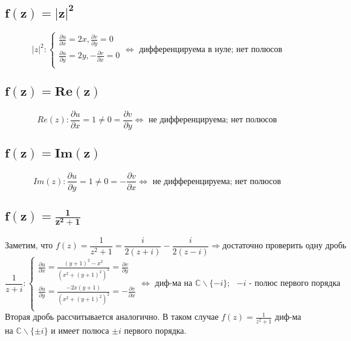 \documentclass[12pt]{article}
\begin{document}
\subsection*{$\mathbf{f(z) = |z|^2}$}
\begin{equation*}
|z|^2:
\begin{cases}
\frac{\partial u}{\partial x} = 2x, \frac{\partial v}{\partial y} = 0 \\
\frac{\partial u}{\partial y} = 2y, -\frac{\partial v}{\partial x} = 0\\
\end{cases}
\Leftrightarrow
\text{ дифференцируема в нуле; нет полюсов}
\end{equation*}

\subsection*{$\mathbf{f(z) = Re(z)}$}
\begin{equation*}
Re(z):
\frac{\partial u}{\partial x} = 1 \neq 0 = \frac{\partial v}{\partial y}
\Leftrightarrow
\text{ не дифференцируема; нет полюсов}
\end{equation*}
\subsection*{$\mathbf{f(z) = Im(z)}$}
\begin{equation*}
Im(z):
\frac{\partial u}{\partial y} = 1 \neq 0 = -\frac{\partial v}{\partial x}
\Leftrightarrow
\text{ не дифференцируема; нет полюсов}
\end{equation*}
\subsection*{$\mathbf{f(z) = \frac{1}{z^2+1}}$}
\[\text{Заметим, что } f(z) = \frac{1}{z^2+1} = \frac{i}{2(z+i)} - \frac{i}{2(z-i)} \Rightarrow \text{достаточно проверить одну дробь} \]
\begin{equation*}
\frac{1}{z+i}:
\begin{cases}
\frac{\partial u}{\partial x} = \frac{(y+1)^2-x^2}{(x^2+(y+1)^2)^2} = \frac{\partial v}{\partial y} \\
\frac{\partial u}{\partial y} = \frac{-2x(y+1)}{(x^2+(y+1)^2)^2} = -\frac{\partial v}{\partial x}\\
\end{cases}
\Leftrightarrow
\text{ диф-ма на } \mathbb{C}\backslash \{-i\}; \text{ $-i$ - полюс первого порядка}
\end{equation*}
Вторая дробь рассчитывается аналогично. В таком случае $f(z) = \frac{1}{z^2+1}$ диф-ма на $\mathbb{C} \backslash \{\pm i\} $ и имеет полюса ${\pm i}$ первого порядка.
\end{document}
